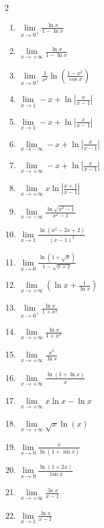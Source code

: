 \documentclass[12pt,a4paper]{article}
\begin{document}
\begin{multicols}{2}
\begin{enumerate}
\item $ \lim\limits_{x \to 0^+} \frac{\ln x}{1 - \ln x} $
\item $ \lim\limits_{x \to +\infty} \frac{\ln x}{1 - \ln x} $ 
\item $ \lim\limits_{x \to 0^+} \frac{1}{x^2}\ln\left(\frac{1 - x^2}{\cos x}\right) $
\item $ \lim\limits_{x \to 1} -x + \ln\left|\frac{x}{x-1}\right| $

\item $ \lim\limits_{x \to 1} -x + \ln\left|\frac{x}{x-1}\right| $ 
\item $ \lim\limits_{x \to -\infty} -x + \ln\left|\frac{x}{x-1}\right| $
\item $ \lim\limits_{x \to +\infty} -x + \ln\left|\frac{x}{x-1}\right| $
\item $ \lim\limits_{x \to +\infty} x \ln\left|\frac{x+1}{x-1}\right| $

\item $ \lim\limits_{x \to -\infty} \frac{\ln\sqrt{x^2 - 1}}{x^2 - 1} $
\item $ \lim\limits_{x \to 1} \frac{\ln(x^2 - 2x + 2)}{(x-1)^2} $
\item $ \lim\limits_{x \to 0} \frac{\ln(1+\sqrt{x})}{1-\sqrt{x+1}} $ 
\item $ \lim\limits_{x \to +\infty} \left(\ln x + \frac{1}{\ln x}\right) $

\item $ \lim\limits_{x \to 0^+} \frac{\ln x}{1+x^2} $ 
\item $ \lim\limits_{x \to +\infty} \frac{\ln x}{1+x^2} $
\item $ \lim\limits_{x \to +\infty} \frac{x^3}{\ln x} $ 
\item $ \lim\limits_{x \to +\infty} \frac{\ln(1+\ln x)}{x} $
\item $ \lim\limits_{x \to +\infty} x \ln x - \ln x $
 

\item $ \lim\limits_{x \to +\infty} \sqrt{x} \ln(x) $ 
\item $ \lim\limits_{x \to 0} \frac{x}{\ln(1+\sin x)} $
\item $ \lim\limits_{x \to 0} \frac{\ln(1+2x)}{\tan x} $
\item $ \lim\limits_{x \to +\infty} \frac{\ln x}{x-1} $
\item $ \lim\limits_{x \to 1} \frac{\ln x}{x-1} $

\end{enumerate}

\end{multicols}
\end{document}
